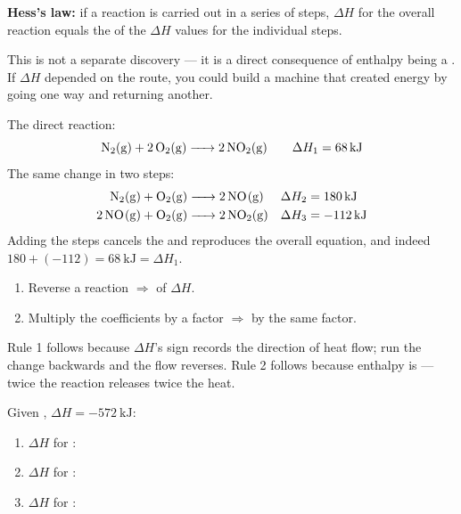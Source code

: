 \documentclass{apchem-notes}
\begin{document}


\begin{apcnote}
\textbf{Hess's law:} if a reaction is carried out in a series of steps,
$\Delta H$ for the overall reaction equals the  of the
$\Delta H$ values for the individual steps.

This is not a separate discovery --- it is a direct consequence of enthalpy
being a . If $\Delta H$ depended on the
route, you could build a machine that created energy by going one way and
returning another.
\end{apcnote}

\begin{workedexample}
The direct reaction:
\[ \ce{N2(g) + 2 O2(g) -> 2 NO2(g)} \qquad \Delta H_1 = \SI{68}{\kilo\joule} \]
The same change in two steps:
\begin{align*}
  \ce{N2(g) + O2(g) &-> 2 NO(g)}   &\Delta H_2 &= \SI{180}{\kilo\joule}\\
  \ce{2 NO(g) + O2(g) &-> 2 NO2(g)} &\Delta H_3 &= \SI{-112}{\kilo\joule}
\end{align*}
Adding the steps cancels the  and reproduces the overall equation,
and indeed $180 + (-112) = \SI{68}{\kilo\joule} = \Delta H_1$.
\end{workedexample}


\begin{enumerate}[leftmargin=*,itemsep=0.2em]
  \item Reverse a reaction $\Rightarrow$ 
        of $\Delta H$.
  \item Multiply the coefficients by a factor $\Rightarrow$
         by the same factor.
\end{enumerate}

Rule 1 follows because $\Delta H$'s sign records the direction of heat flow;
run the change backwards and the flow reverses. Rule 2 follows because
enthalpy is  --- twice the reaction releases twice the heat.


Given , $\Delta H = \SI{-572}{\kilo\joule}$:
\begin{enumerate}[leftmargin=*,itemsep=0.3em]
  \item $\Delta H$ for :
  \item $\Delta H$ for :
  \item $\Delta H$ for :
\end{enumerate}
\end{document}
